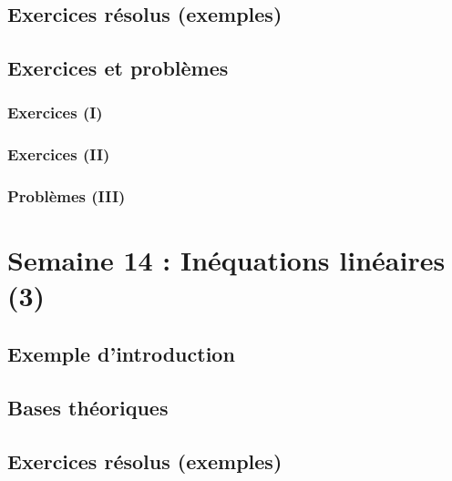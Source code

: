 \documentclass[
  12pt,
]{book}
\begin{document}
\hypertarget{exercices-ruxe9solus-exemples-12}{%
\section{Exercices résolus (exemples)}\label{exercices-ruxe9solus-exemples-12}}

\hypertarget{exercices-et-probluxe8mes-12}{%
\section{Exercices et problèmes}\label{exercices-et-probluxe8mes-12}}

\hypertarget{exercices-i-12}{%
\subsection{Exercices (I)}\label{exercices-i-12}}

\hypertarget{exercices-ii-12}{%
\subsection{Exercices (II)}\label{exercices-ii-12}}

\hypertarget{probluxe8mes-iii-12}{%
\subsection{Problèmes (III)}\label{probluxe8mes-iii-12}}

\hypertarget{semaine-14-inuxe9quations-linuxe9aires-3}{%
\chapter{Semaine 14 : Inéquations linéaires (3)}\label{semaine-14-inuxe9quations-linuxe9aires-3}}

\hypertarget{exemple-dintroduction-13}{%
\section{Exemple d'introduction}\label{exemple-dintroduction-13}}

\hypertarget{bases-thuxe9oriques-13}{%
\section{Bases théoriques}\label{bases-thuxe9oriques-13}}

\hypertarget{exercices-ruxe9solus-exemples-13}{%
\section{Exercices résolus (exemples)}\label{exercices-ruxe9solus-exemples-13}}
\end{document}

